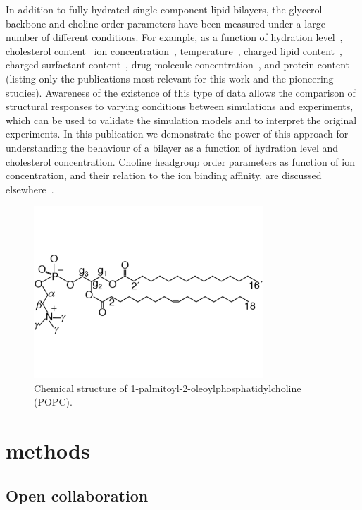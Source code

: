 \documentclass[journal=jacsat,manuscript=article]{achemso}
\begin{document}
In addition to fully hydrated single component lipid bilayers, the glycerol backbone and choline order parameters
have been measured under a large number of different conditions. For example, as a function of hydration level~\cite{bechinger91,ulrich94,dvinskikh05b}, cholesterol content~\cite{brown78,ferreira13}
ion concentration~\cite{brown77,akutsu81,altenbach84,roux90,roux91}, temperature~\cite{gally75}, charged lipid content~\cite{roux90,roux91}, charged surfactant content~\cite{scherer89}, 
drug molecule concentration~\cite{browning82,kelusky84,castro08}, and protein content~\cite{roux89,kuchinka89} (listing only the publications most relevant for this work and the pioneering studies).
Awareness of the existence of this type of data allows the comparison of structural responses to varying conditions between simulations and experiments,
which can be used to validate the simulation models and to interpret the original experiments. 
In this publication we demonstrate the power of this approach for understanding the behaviour of a bilayer as a function of hydration level and cholesterol concentration.
Choline headgroup order parameters as function of ion concentration, and their relation to the ion binding affinity, are discussed elsewhere~\cite{ionpaper}.

  \begin{figure}[]
  \centering
  \includegraphics[width=8.6cm]{../Fig/POPCstructure.pdf}

  \caption{\label{POPCstructure}
    Chemical structure of  1-palmitoyl-2-oleoylphosphatidylcholine (POPC).}
  
\end{figure}

\section{methods}

\subsection{Open collaboration}
\end{document}
